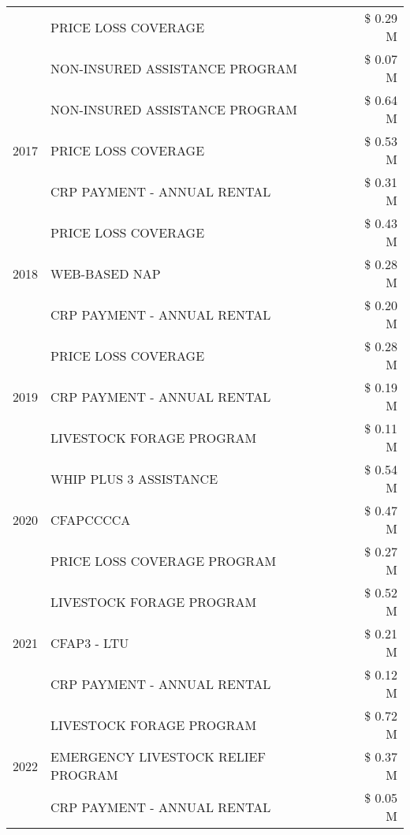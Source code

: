 \begin{tabular}{llr}
 & PRICE LOSS COVERAGE & \$ 0.29 M \\
 & NON-INSURED ASSISTANCE PROGRAM & \$ 0.07 M \\
\cline{1-3}
\multirow[t]{3}{*}{2017} & NON-INSURED ASSISTANCE PROGRAM & \$ 0.64 M \\
 & PRICE LOSS COVERAGE & \$ 0.53 M \\
 & CRP PAYMENT - ANNUAL RENTAL & \$ 0.31 M \\
\cline{1-3}
\multirow[t]{3}{*}{2018} & PRICE LOSS COVERAGE & \$ 0.43 M \\
 & WEB-BASED NAP & \$ 0.28 M \\
 & CRP PAYMENT - ANNUAL RENTAL & \$ 0.20 M \\
\cline{1-3}
\multirow[t]{3}{*}{2019} & PRICE LOSS COVERAGE & \$ 0.28 M \\
 & CRP PAYMENT - ANNUAL RENTAL & \$ 0.19 M \\
 & LIVESTOCK FORAGE PROGRAM & \$ 0.11 M \\
\cline{1-3}
\multirow[t]{3}{*}{2020} & WHIP PLUS 3 ASSISTANCE & \$ 0.54 M \\
 & CFAPCCCCA & \$ 0.47 M \\
 & PRICE LOSS COVERAGE PROGRAM & \$ 0.27 M \\
\cline{1-3}
\multirow[t]{3}{*}{2021} & LIVESTOCK FORAGE PROGRAM & \$ 0.52 M \\
 & CFAP3 - LTU & \$ 0.21 M \\
 & CRP PAYMENT - ANNUAL RENTAL & \$ 0.12 M \\
\cline{1-3}
\multirow[t]{3}{*}{2022} & LIVESTOCK FORAGE PROGRAM & \$ 0.72 M \\
 & EMERGENCY LIVESTOCK RELIEF PROGRAM & \$ 0.37 M \\
 & CRP PAYMENT - ANNUAL RENTAL & \$ 0.05 M \\
\cline{1-3}
\bottomrule
\end{tabular}

